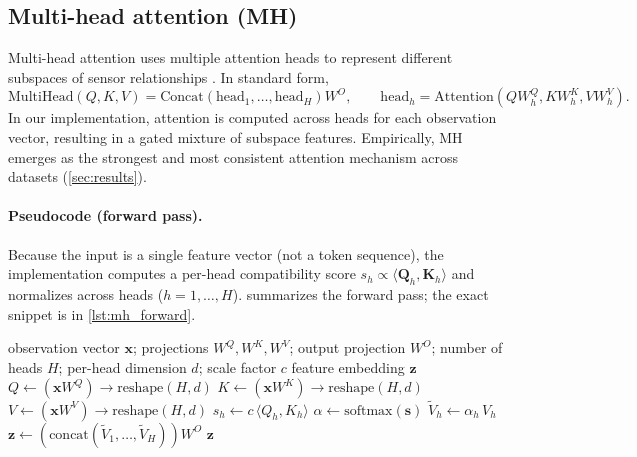 \documentclass[11pt]{article}
\begin{document}
\subsection{Multi-head attention (MH)}
Multi-head attention uses multiple attention heads to represent different subspaces of sensor relationships \parencite{Vaswani2017Attention}. In standard form,
\begin{equation}
\mathrm{MultiHead}(Q,K,V)=\mathrm{Concat}(\mathrm{head}_1,\ldots,\mathrm{head}_H)W^O,
\qquad \mathrm{head}_h=\mathrm{Attention}(QW_h^Q,KW_h^K,VW_h^V).
\end{equation}
In our implementation, attention is computed across heads for each observation vector, resulting in a gated mixture of subspace features. Empirically, MH emerges as the strongest and most consistent attention mechanism across datasets (\cref{sec:results}).

\paragraph{Pseudocode (forward pass).}
Because the input is a single feature vector (not a token sequence), the implementation computes a per-head compatibility score $s_h \propto \langle \mathbf{Q}_h,\mathbf{K}_h\rangle$ and normalizes across heads ($h=1,\dots,H$).  summarizes the forward pass; the exact snippet is in \cref{lst:mh_forward}.

\begin{algorithm}[t]
\caption{Multi-head attention feature extractor (forward pass; head-gating over $H$ heads)}
\label{alg:mh_forward}
\begin{algorithmic}[1]
\Require observation vector $\mathbf{x}$; projections $W^Q,W^K,W^V$; output projection $W^O$; number of heads $H$; per-head dimension $d$; scale factor $c$
\Ensure feature embedding $\mathbf{z}$
\State $Q \gets (\mathbf{x}W^Q) \rightarrow \text{reshape}(H, d)$
\State $K \gets (\mathbf{x}W^K) \rightarrow \text{reshape}(H, d)$
\State $V \gets (\mathbf{x}W^V) \rightarrow \text{reshape}(H, d)$
	\State $s_h \gets c\,\langle Q_h, K_h\rangle$
\EndFor
\State $\alpha \gets \mathrm{softmax}(\mathbf{s})$ 
	\State $\tilde{V}_h \gets \alpha_h\,V_h$
\EndFor
\State $\mathbf{z} \gets (\mathrm{concat}(\tilde{V}_1,\ldots,\tilde{V}_H))W^O$
\State \Return $\mathbf{z}$
\end{algorithmic}
\end{algorithm}
\end{document}
